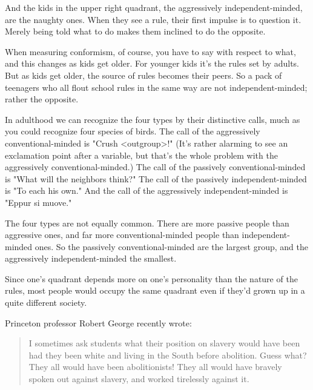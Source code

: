 And
                  the kids in the upper right quadrant, the aggressively
                  independent-minded, are the naughty ones. When they see a
                  rule, their first impulse is to question it. Merely being told
                  what to do makes them inclined to do the opposite.

When
                  measuring conformism, of course, you have to say with respect
                  to what, and this changes as kids get older. For younger kids
                  it's the rules set by adults. But as kids get older, the
                  source of rules becomes their peers. So a pack of teenagers
                  who all flout school rules in the same way are not
                  independent-minded; rather the opposite.

In
                  adulthood we can recognize the four types by their distinctive
                  calls, much as you could recognize four species of birds. The
                  call of the aggressively conventional-minded is "Crush
                  <outgroup>!" (It's rather alarming to see an exclamation
                  point after a variable, but that's the whole problem with the
                  aggressively conventional-minded.) The call of the passively
                  conventional-minded is "What will the neighbors think?" The
                  call of the passively independent-minded is "To each his own."
                  And the call of the aggressively independent-minded is "Eppur
                  si muove."

The four types are not equally common.
                  There are more passive people than aggressive ones, and far
                  more conventional-minded people than independent-minded ones.
                  So the passively conventional-minded are the largest group,
                  and the aggressively independent-minded the smallest.

Since
                  one's quadrant depends more on one's personality than the
                  nature of the rules, most people would occupy the same
                  quadrant even if they'd grown up in a quite different
                  society.

Princeton professor Robert George recently
                  wrote:
                  \begin{quote}

                    I sometimes ask students what their position on slavery
                    would have been had they been white and living in the South
                    before abolition. Guess what? They all would have been
                    abolitionists! They all would have bravely spoken out
                    against slavery, and worked tirelessly against it.
                  
\end{quote}

